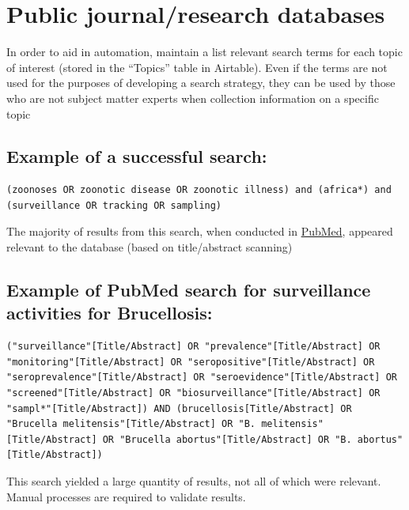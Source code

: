 \documentclass[
]{book}
\begin{document}
\hypertarget{update-public-research}{%
\section{Public journal/research databases}\label{update-public-research}}

In order to aid in automation, maintain a list relevant search terms for each topic of interest (stored in the ``Topics'' table in Airtable). Even if the terms are not used for the purposes of developing a search strategy, they can be used by those who are not subject matter experts when collection information on a specific topic

\hypertarget{example-of-a-successful-search}{%
\subsection{Example of a successful search:}\label{example-of-a-successful-search}}

\begin{verbatim}
(zoonoses OR zoonotic disease OR zoonotic illness) and (africa*) and (surveillance OR tracking OR sampling)
\end{verbatim}

The majority of results from this search, when conducted in \href{https://pubmed.ncbi.nlm.nih.gov/}{PubMed}, appeared relevant to the database (based on title/abstract scanning)

\hypertarget{example-of-pubmed-search-for-surveillance-activities-for-brucellosis}{%
\subsection{Example of PubMed search for surveillance activities for Brucellosis:}\label{example-of-pubmed-search-for-surveillance-activities-for-brucellosis}}

\begin{verbatim}
("surveillance"[Title/Abstract] OR "prevalence"[Title/Abstract] OR "monitoring"[Title/Abstract] OR "seropositive"[Title/Abstract] OR "seroprevalence"[Title/Abstract] OR "seroevidence"[Title/Abstract] OR "screened"[Title/Abstract] OR "biosurveillance"[Title/Abstract] OR "sampl*"[Title/Abstract]) AND (brucellosis[Title/Abstract] OR "Brucella melitensis"[Title/Abstract] OR "B. melitensis"[Title/Abstract] OR "Brucella abortus"[Title/Abstract] OR "B. abortus"[Title/Abstract])  
\end{verbatim}

This search yielded a large quantity of results, not all of which were relevant. Manual processes are required to validate results.
\end{document}
